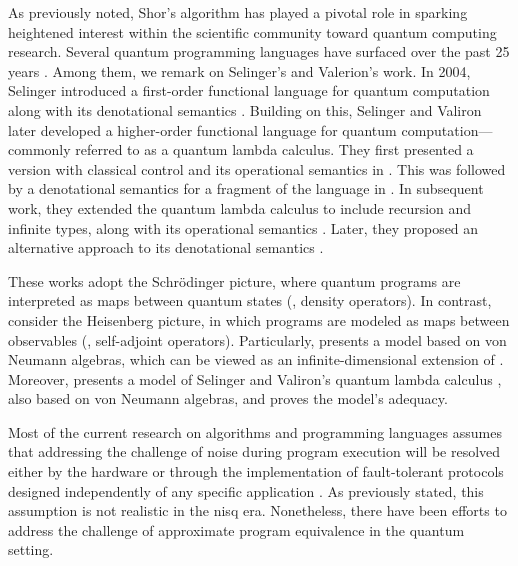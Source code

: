 As previously noted, Shor's algorithm has played a pivotal role in sparking heightened interest within the scientific community toward quantum computing research. Several quantum programming languages have surfaced over the past 25 years \cite{zhao2020quantum,serrano2022quantum}. Among them, we remark on Selinger's and Valerion's work. In 2004, Selinger introduced a first-order functional language for quantum computation along with its denotational semantics \cite{selinger2004towards}. Building on this, Selinger and Valiron later developed a higher-order functional language for quantum computation—commonly referred to as a quantum lambda calculus. They first presented a version with classical control and its operational semantics in \cite{selinger2006lambda}. This was followed by a denotational semantics for a fragment of the language in \cite{selinger2008fully}. In subsequent work, they extended the quantum lambda calculus to include recursion and infinite types, along with its operational semantics \cite{selinger2009quantum}. Later, they proposed an alternative approach to its denotational semantics \cite{selinger2014}.


These works adopt the Schr\"odinger picture, where quantum programs are interpreted as maps between quantum states (\ie, density operators). In contrast, \cite{choSemanticsQuantumProgramming2016, choNeumannAlgebrasForm2016} consider the Heisenberg picture, in which programs are modeled as maps between observables (\ie, self-adjoint operators). Particularly, \cite{choSemanticsQuantumProgramming2016} presents a model based on von Neumann algebras, which can be viewed as an infinite-dimensional extension of \cite{selinger2004towards}. Moreover, \cite{choSemanticsQuantumProgramming2016} presents a model of Selinger and Valiron’s quantum lambda calculus \cite{selinger2006lambda, selinger2008linear, selinger2009quantum}, also based on von Neumann algebras, and proves the model's adequacy.


Most of the current research on algorithms and programming languages assumes that addressing the challenge of noise during program execution will be resolved either by the hardware or through the implementation of fault-tolerant protocols designed independently of any specific application \cite{chong2017programming}. As previously stated, this assumption is not realistic in the \acrshort{nisq} era. Nonetheless, there have been efforts to address the challenge of approximate program equivalence in the quantum setting. 


